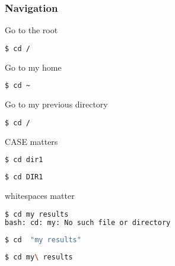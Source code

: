 \documentclass{beamer}
\begin{document}
\begin{frame}[fragile]
\frametitle{Navigation}

Go to the root
\begin{lstlisting}[language=bash]
$ cd /
\end{lstlisting}

Go to my home
\begin{lstlisting}[language=bash]
$ cd ~
\end{lstlisting}

Go to my previous directory
\begin{lstlisting}[language=bash]
$ cd /
\end{lstlisting}

\end{frame}

\begin{frame}[fragile]
 \begin{center}
    \huge{CASE matters}\\
    \end{center}
\begin{lstlisting}[language=bash]
$ cd dir1
\end{lstlisting}


\begin{lstlisting}[language=bash]
$ cd DIR1
\end{lstlisting}

\end{frame}


\begin{frame}[fragile]
 \begin{center}
    \huge{whitespaces matter}\\
    \end{center}
\begin{lstlisting}[language=bash]
$ cd my results
bash: cd: my: No such file or directory
\end{lstlisting}


\begin{lstlisting}[language=bash]
$ cd  "my results"
\end{lstlisting}

\begin{lstlisting}[language=bash]
$ cd my\ results
\end{lstlisting}
  
\end{frame}
\end{document}
